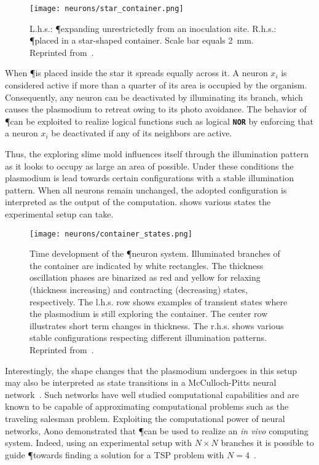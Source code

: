 			\begin{figure}[!htbp]
			\centering
			\texttt{[image: neurons/star\_container.png]}
			\caption[\P neurons - Setup]{L.h.s.: \P expanding unrestrictedly from an inoculation site. R.h.s.: \P placed in a star-shaped container. Scale bar equals \SI{2}{\milli\metre}. Reprinted from~\cite{Aono:2007:ANC:1284621.1284651}.}
			\label{fig:neurons_setup}
			\end{figure}

			When \P is placed inside the star it spreads equally across it. A neuron $x_i$ is considered active if more than a quarter of its area is occupied by the organism. Consequently, any neuron can be deactivated by illuminating its branch, which causes the plasmodium to retreat owing to its photo avoidance. The behavior of \P can be exploited to realize logical functions such as logical \textbf{\texttt{NOR}} by enforcing that a neuron $x_i$ be deactivated if any of its neighbors are active. 

			Thus, the exploring slime mold influences itself through the illumination pattern as it looks to occupy as large an area of possible. Under these conditions the plasmodium is lead towards certain configurations with a stable illumination pattern. When all neurons remain unchanged, the adopted configuration is interpreted as the output of the computation.  shows various states the experimental setup can take.

			\begin{figure}[!htbp]
			\centering
			\texttt{[image: neurons/container\_states.png]}
			\caption[\P neurons - State transitions]{Time development of the \P neuron system. Illuminated branches of the container are indicated by white rectangles. The thickness oscillation phases are binarized as red and yellow for relaxing (thickness increasing) and contracting (decreasing) states, respectively. The l.h.s. row shows examples of transient states where the plasmodium is still exploring the container. The center row illustrates short term changes in thickness. The r.h.s. shows various stable configurations respecting different illumination patterns. Reprinted from~\cite{Aono:2007:ANC:1284621.1284651}. }
			\label{fig:neurons_states}
			\end{figure}

			Interestingly, the shape changes that the plasmodium undergoes in this setup may also be interpreted as state transitions in a McCulloch-Pitts neural network~\cite{Aono:2007:ANC:1284621.1284651}. Such networks have well studied computational capabilities and are known to be capable of approximating computational problems such as the traveling salesman problem. Exploiting the computational power of neural networks, Aono \etal demonstrated that \P can be used to realize an \textit{in vivo} computing system. Indeed, using an experimental setup with $N \times N$ branches it is possible to guide \P towards finding a solution for a TSP problem with $N=4$~\cite{Aono2009}. 

